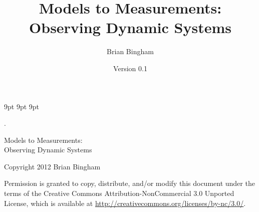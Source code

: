 \documentclass[11pt]{book}
\begin{document}
\graphicspath{{./}{./figs/}}

%

\newcommand{\bmcode}{\begin{lstlisting}[style=myMatStyle]}
\newcommand{\emcode}{\end{lstlisting}}

\newcommand{\SF}{0.2}
\newcommand{\SFb}{0.3}

\newcommand{\FigWidth}{0.7}

\newcommand{\scaleOneTwo}[2] {\scalebox{#2}}

\graphicspath{{./figs/}}


     {9pt}%
     {9pt}%
     {\itshape}%
     {}%
     {\bfseries}%
     {}%
     {9pt}%
     {}%


\theoremstyle{myex}
\newtheorem{ex}{Exercise}[chapter]



\frontmatter
\newcommand{\thetitle}{Models to Measurements: \\Observing Dynamic Systems}
\title{\thetitle}
\author{Brian Bingham}
\date{Version 0.1}

\maketitle
.
\vspace{2in} %
 
\begin{center}
{\Large \thetitle}
\vspace{0.5in}

Copyright 2012 Brian Bingham
\end{center}

Permission is granted to copy, distribute, and/or modify this document
under the terms of the Creative Commons Attribution-NonCommercial 3.0 Unported
License, which is available at \url{http://creativecommons.org/licenses/by-nc/3.0/}.
\end{document}
